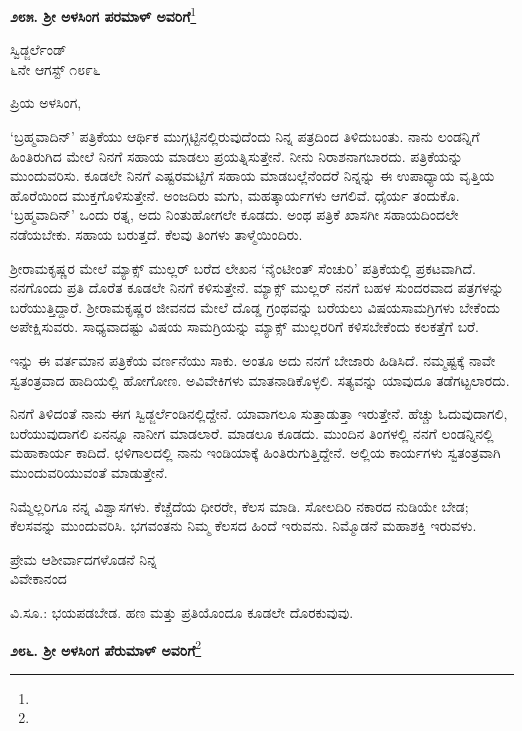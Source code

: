\begin{center}
\textbf{೨೮೫. ಶ‍್ರೀ ಅಳಸಿಂಗ ಪರಮಾಳ್ ಅವರಿಗೆ}\footnote{}
\end{center}

\begin{flushright}
ಸ್ವಿಡ್ಜರ್ಲೆಂಡ್\\೬ನೇ ಆಗಸ್ಟ್ ೧೮೯೬
\end{flushright}

\noindent
ಪ್ರಿಯ ಅಳಸಿಂಗ,

‘ಬ್ರಹ್ಮವಾದಿನ್’ ಪತ್ರಿಕೆಯು ಆರ್ಥಿಕ ಮುಗ್ಗಟ್ಟಿನಲ್ಲಿರುವುದೆಂದು ನಿನ್ನ ಪತ್ರದಿಂದ ತಿಳಿದುಬಂತು. ನಾನು ಲಂಡನ್ನಿಗೆ ಹಿಂತಿರುಗಿದ ಮೇಲೆ ನಿನಗೆ ಸಹಾಯ ಮಾಡಲು ಪ್ರಯತ್ನಿಸುತ್ತೇನೆ. ನೀನು ನಿರಾಶನಾಗಬಾರದು. ಪತ್ರಿಕೆಯನ್ನು ಮುಂದುವರಿಸು. ಕೂಡಲೇ ನಿನಗೆ ಎಷ್ಟರಮಟ್ಟಿಗೆ ಸಹಾಯ ಮಾಡಬಲ್ಲೆನೆಂದರೆ ನಿನ್ನನ್ನು ಈ ಉಪಾಧ್ಯಾಯ ವೃತ್ತಿಯ ಹೊರೆಯಿಂದ ಮುಕ್ತಗೊಳಿಸುತ್ತೇನೆ. ಅಂಜದಿರು ಮಗು, ಮಹತ್ಕಾರ್ಯಗಳು ಆಗಲಿವೆ. ಧೈರ್ಯ ತಂದುಕೊ. ‘ಬ್ರಹ್ಮವಾದಿನ್’ ಒಂದು ರತ್ನ, ಅದು ನಿಂತುಹೋಗಲೇ ಕೂಡದು. ಅಂಥ ಪತ್ರಿಕೆ ಖಾಸಗೀ ಸಹಾಯದಿಂದಲೇ ನಡೆಯಬೇಕು. ಸಹಾಯ ಬರುತ್ತದೆ. ಕೆಲವು ತಿಂಗಳು ತಾಳ್ಮೆಯಿಂದಿರು.

ಶ‍್ರೀರಾಮಕೃಷ್ಣರ ಮೇಲೆ ಮ್ಯಾಕ್ಸ್ ಮುಲ್ಲರ್ ಬರೆದ ಲೇಖನ ‘ನೈಂಟೀಂತ್ ಸೆಂಚುರಿ’ ಪತ್ರಿಕೆಯಲ್ಲಿ ಪ್ರಕಟವಾಗಿದೆ. ನನಗೊಂದು ಪ್ರತಿ ದೊರೆತ ಕೂಡಲೇ ನಿನಗೆ ಕಳಿಸುತ್ತೇನೆ. ಮ್ಯಾಕ್ಸ್ ಮುಲ್ಲರ್ ‌ನನಗೆ ಬಹಳ ಸುಂದರವಾದ ಪತ್ರಗಳನ್ನು ಬರೆಯುತ್ತಿದ್ದಾರೆ. ಶ‍್ರೀರಾಮ\break ಕೃಷ್ಣರ ಜೀವನದ ಮೇಲೆ ದೊಡ್ಡ ಗ್ರಂಥವನ್ನು ಬರೆಯಲು ವಿಷಯಸಾಮಗ್ರಿಗಳು ಬೇಕೆಂದು ಅಪೇಕ್ಷಿಸುವರು. ಸಾಧ್ಯವಾದಷ್ಟು ವಿಷಯ ಸಾಮಗ್ರಿಯನ್ನು ಮ್ಯಾಕ್ಸ್ ಮುಲ್ಲರರಿಗೆ ಕಳಿಸಬೇಕೆಂದು ಕಲಕತ್ತೆಗೆ ಬರೆ.

ಇನ್ನು ಈ ವರ್ತಮಾನ ಪತ್ರಿಕೆಯ ವರ್ಣನೆಯು ಸಾಕು. ಅಂತೂ ಅದು ನನಗೆ ಬೇಜಾರು ಹಿಡಿಸಿದೆ. ನಮ್ಮಷ್ಟಕ್ಕೆ ನಾವೇ ಸ್ವತಂತ್ರವಾದ ಹಾದಿಯಲ್ಲಿ ಹೋಗೋಣ. ಅವಿವೇಕಿಗಳು ಮಾತನಾಡಿಕೊಳ್ಳಲಿ. ಸತ್ಯವನ್ನು ಯಾವುದೂ ತಡೆಗಟ್ಟಲಾರದು.

ನಿನಗೆ ತಿಳಿದಂತೆ ನಾನು ಈಗ ಸ್ವಿಡ್ಜರ್ಲೆಂಡಿನಲ್ಲಿದ್ದೇನೆ. ಯಾವಾಗಲೂ ಸುತ್ತಾಡುತ್ತಾ ಇರುತ್ತೇನೆ. ಹೆಚ್ಚು ಓದುವುದಾಗಲಿ, ಬರೆಯುವುದಾಗಲಿ ಏನನ್ನೂ ನಾನೀಗ ಮಾಡಲಾರೆ. ಮಾಡಲೂ ಕೂಡದು. ಮುಂದಿನ ತಿಂಗಳಲ್ಲಿ ನನಗೆ ಲಂಡನ್ನಿನಲ್ಲಿ ಮಹಾಕಾರ್ಯ ಕಾದಿದೆ. ಛಳಿಗಾಲದಲ್ಲಿ ನಾನು ಇಂಡಿಯಾಕ್ಕೆ ಹಿಂತಿರುಗುತ್ತಿದ್ದೇನೆ. ಅಲ್ಲಿಯ ಕಾರ್ಯಗಳು ಸ್ವತಂತ್ರವಾಗಿ ಮುಂದುವರಿಯುವಂತೆ ಮಾಡುತ್ತೇನೆ.

ನಿಮ್ಮೆಲ್ಲರಿಗೂ ನನ್ನ ವಿಶ್ವಾಸಗಳು. ಕೆಚ್ಚೆದೆಯ ಧೀರರೇ, ಕೆಲಸ ಮಾಡಿ. ಸೋಲದಿರಿ\enginline{-} ನಕಾರದ ನುಡಿಯೇ ಬೇಡ; ಕೆಲಸವನ್ನು ಮುಂದುವರಿಸಿ. ಭಗವಂತನು ನಿಮ್ಮ ಕೆಲಸದ ಹಿಂದೆ ಇರುವನು. ನಿಮ್ಮೊಡನೆ ಮಹಾಶಕ್ತಿ ಇರುವಳು.

\begin{flushright}
ಪ್ರೇಮ ಆಶೀರ್ವಾದಗಳೊಡನೆ ನಿನ್ನ\\ವಿವೇಕಾನಂದ
\end{flushright}

ವಿ.ಸೂ.: ಭಯಪಡಬೇಡ. ಹಣ ಮತ್ತು ಪ್ರತಿಯೊಂದೂ ಕೂಡಲೇ ದೊರಕುವುವು.

\begin{center}
\textbf{೨೮೬. ಶ‍್ರೀ ಅಳಸಿಂಗ ಪೆರುಮಾಳ್ ಅವರಿಗೆ}\footnote{}
\end{center}

